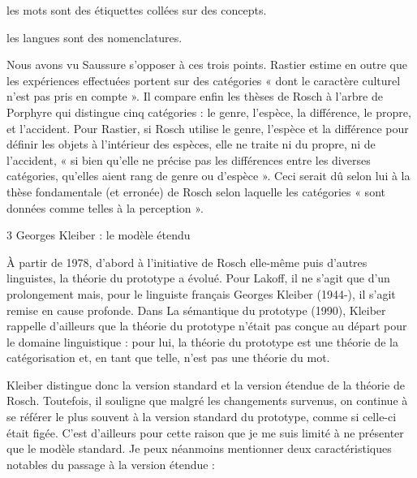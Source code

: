 \noindent{\color{BellaTeal}$\diamond$}\hspace{.6em}les mots sont des étiquettes collées sur des concepts.\par

\noindent{\color{BellaTeal}$\diamond$}\hspace{.6em}les langues sont des nomenclatures.\par




Nous avons vu Saussure s’opposer à ces trois points. Rastier estime en outre que les expériences effectuées portent sur des catégories « dont le caractère culturel n’est pas pris en compte ». Il compare enfin les thèses de Rosch à l’arbre de Porphyre qui distingue cinq catégories : le genre, l’espèce, la différence, le propre, et l’accident. Pour Rastier, si Rosch utilise le genre, l’espèce et la différence pour définir les objets à l’intérieur des espèces, elle ne traite ni du propre, ni de l’accident, « si bien qu’elle ne précise pas les différences entre les diverses catégories, qu’elles aient rang de genre ou d’espèce ». Ceci serait dû selon lui à la thèse fondamentale (et erronée) de Rosch selon laquelle les catégories « sont données comme telles à la perception ».\par

3 Georges Kleiber : le modèle étendu\par

À partir de 1978, d’abord à l’initiative de Rosch elle-même puis d’autres linguistes, la théorie du prototype a évolué. Pour Lakoff, il ne s’agit que d’un prolongement mais, pour le linguiste français Georges Kleiber (1944-), il s’agit remise en cause profonde. Dans La sémantique du prototype (1990), Kleiber rappelle d’ailleurs que la théorie du prototype n’était pas conçue au départ pour le domaine linguistique : pour lui, la théorie du prototype est une théorie de la catégorisation et, en tant que telle, n’est pas une théorie du mot.\par

Kleiber distingue donc la version standard et la version étendue de la théorie de Rosch. Toutefois, il souligne que malgré les changements survenus, on continue à se référer le plus souvent à la version standard du prototype, comme si celle-ci était figée. C’est d’ailleurs pour cette raison que je me suis limité à ne présenter que le modèle standard. Je peux néanmoins mentionner deux caractéristiques notables du passage à la version étendue :\par

